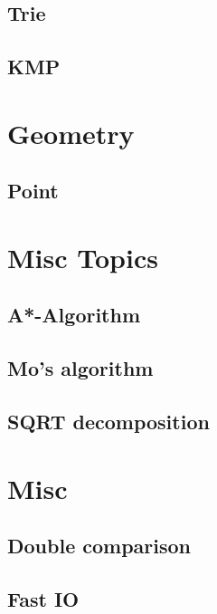 \subsection{Trie}
\raggedbottom
\hrulefill
\subsection{KMP}
\raggedbottom
\hrulefill


\section{Geometry}
\subsection{Point}
\raggedbottom
\hrulefill


\section{Misc Topics}
\subsection{A*-Algorithm}
\raggedbottom
\hrulefill
\subsection{Mo's algorithm}
\raggedbottom
\hrulefill
\subsection{SQRT decomposition}
\raggedbottom
\hrulefill


\section{Misc}
\subsection{Double comparison}
\raggedbottom
\hrulefill
\subsection{Fast IO}
\raggedbottom
\hrulefill
